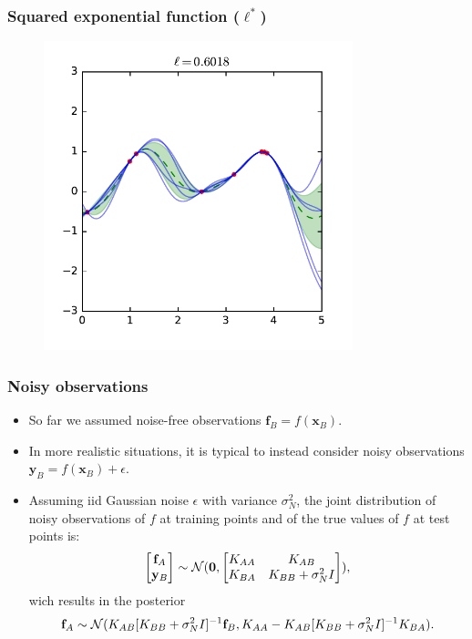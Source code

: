\documentclass{beamer}
\begin{document}
\begin{frame}
    \frametitle{Squared exponential function ($\ell^*$)}

    \begin{figure}
        \centering
        \includegraphics[width=0.8\textwidth]{./figures/rbf-ml.pdf}
    \end{figure}
\end{frame}


\begin{frame}
    \frametitle{Noisy observations}

    \begin{itemize}
        \item So far we assumed noise-free observations $\mathbf{f}_B = f(\mathbf{x}_B)$.
        \item In more realistic situations, it is typical to instead consider noisy observations $\mathbf{y}_B = f(\mathbf{x}_B) + \epsilon$.
        \item Assuming iid Gaussian noise $\epsilon$ with variance $\sigma^2_N$, the joint distribution of noisy observations of $f$ at training points and of the true values of $f$ at test points is:
        $$\begin{bmatrix}\mathbf{f}_A\\
                         \mathbf{y}_B\end{bmatrix} \sim {\cal N}(\mathbf{0}, \begin{bmatrix}K_{AA} & K_{AB} \\
                                                                                            K_{BA} & K_{BB} + \sigma^2_N I\end{bmatrix}),$$
        wich results in the posterior
        $$\mathbf{f}_A \sim {\cal N}(K_{AB}[K_{BB} + \sigma^2_N I]^{-1}{\mathbf{f}_B}, K_{AA} - K_{AB}[K_{BB} + \sigma^2_N I]^{-1}K_{BA}).$$
    \end{itemize}

\end{frame}
\end{document}
